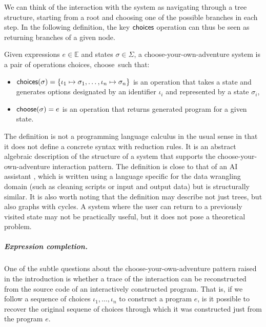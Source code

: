 \documentclass[ a4paper,UKenglish,cleveref, autoref, thm-restate]{lipics-v2021}
\newcommand{\ident}[1]{\textsf{#1}}
\newcommand{\select}{\textnormal{\ident{choose}}}
\newcommand{\choices}{\textnormal{\ident{choices}}}
\begin{document}
We can think of the interaction with the system as navigating through a tree structure, starting
from a root and choosing one of the possible branches in each step. %
In the following definition, the key $\choices$ operation can thus be seen as returning
branches of a given node.

\begin{definition}\label{def:calculus}
Given expressions $e\in \mathbb{E}$ and states $\sigma \in \Sigma$, a choose-your-own-adventure
system is a pair of operations \choices, \select\ such that:

\vspace{-0.5em}
\raggedright
\begin{itemize}
  \item $\choices(\sigma) = \{\iota_1\mapsto\sigma_1, \ldots, \iota_n\mapsto\sigma_n\}$ is
    an operation that takes a state and \\ generates options designated by an identifier $\iota_i$
    and represented by a state $\sigma_i$,
  \item $\select(\sigma) = e$ is an operation that returns generated program for a given state.
\end{itemize}
\end{definition}

The definition is not a programming language calculus in the usual sense in that it does not
define a concrete syntax with reduction rules. It is an abstract algebraic description of
the structure of a system that supports the choose-your-own-adventure interaction pattern.
The definition is close to that of an AI assistant \cite{petricek-2023-aias}, which is written
using a language specific for the data wrangling domain (such as cleaning scripts or input and
output data) but is structurally similar. It is also worth noting that the definition may describe
not just trees, but also graphs with cycles. A system where the user can return to a previously
visited state may not be practically useful, but it does not pose a theoretical problem.


\subparagraph{Expression completion.}
One of the subtle questions about the choose-your-own-adventure pattern raised in the introduction
is whether a trace of the interaction can be reconstructed from the source code of an interactively
constructed program. That is, if we follow a sequence of choices $\iota_1, \ldots, \iota_n$ to
construct a program $e$, is it possible to recover the original sequene of choices through which
it was constructed just from the program $e$.
\end{document}
